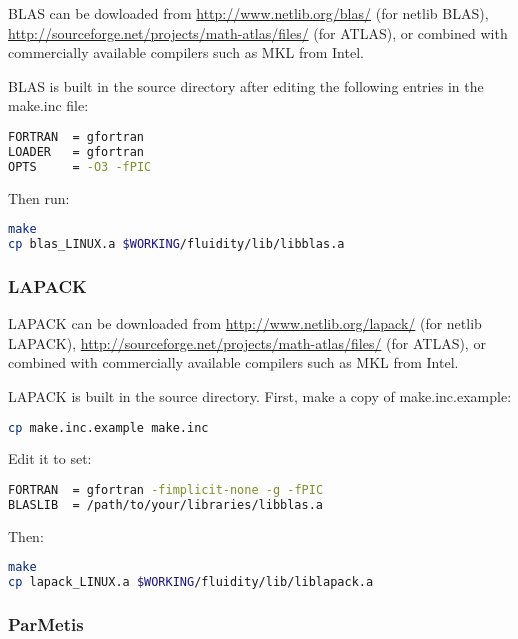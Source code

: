 BLAS can be dowloaded from \url{http://www.netlib.org/blas/} (for netlib BLAS),
\url{http://sourceforge.net/projects/math-atlas/files/} (for ATLAS), or
combined with commercially available compilers such as MKL from Intel.

BLAS is built in the source directory after editing the following entries in
the make.inc file:

\begin{lstlisting}[language=bash]
FORTRAN  = gfortran
LOADER   = gfortran
OPTS     = -O3 -fPIC
\end{lstlisting}

Then run:

\begin{lstlisting}[language=bash]
make
cp blas_LINUX.a $WORKING/fluidity/lib/libblas.a
\end{lstlisting}

\subsubsection{LAPACK}
\label{sec:required_libraries_numerical_lapack}

LAPACK can be downloaded from \url{http://www.netlib.org/lapack/} (for netlib
LAPACK), \url{http://sourceforge.net/projects/math-atlas/files/} (for ATLAS),
or combined with commercially available compilers such as MKL from Intel. 

LAPACK is built in the source directory. First, make a copy of
make.inc.example:

\begin{lstlisting}[language=bash]
cp make.inc.example make.inc
\end{lstlisting}

Edit it to set:

\begin{lstlisting}[language=bash]
FORTRAN  = gfortran -fimplicit-none -g -fPIC
BLASLIB  = /path/to/your/libraries/libblas.a
\end{lstlisting}

Then:

\begin{lstlisting}[language=bash]
make
cp lapack_LINUX.a $WORKING/fluidity/lib/liblapack.a
\end{lstlisting}

\subsubsection{ParMetis}
\label{sec:required_libraries_numerical_parmetis}

